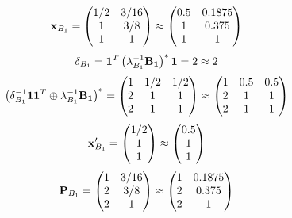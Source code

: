 \documentclass[10pt,a4paper]{article}
\begin{document}
	\[
		\bold{x}_{B_1} = 
		\begin{pmatrix}
			{1} / {{2}} & {{3}} / {{16}} \\
			{1}{} & {{3}} / {{8}} \\
			{1}{} & {1}{} \\
		\end{pmatrix}
		\approx
		\begin{pmatrix}
			0.5      & 0.1875   \\
			1        & 0.375    \\
			1        & 1        \\
		\end{pmatrix}
	\]
	\[
		\delta_{B_1} = \bold{1}^T \left(\lambda_{B_1}^{-1}\bold{B_1}\right)^* \bold{1} = {{2}}{}\approx 2
	\]
	\[
		\left(\delta_{B_1}^{-1}\bold{11}^T \oplus \lambda_{B_1}^{-1}\bold{B_1}\right)^* = 
		\begin{pmatrix}
			{1}{} & {1} / {{2}} & {1} / {{2}} \\
			{{2}}{} & {1}{} & {1}{} \\
			{{2}}{} & {1}{} & {1}{} \\
		\end{pmatrix}
		\approx
		\begin{pmatrix}
			1        & 0.5      & 0.5      \\
			2        & 1        & 1        \\
			2        & 1        & 1        \\
		\end{pmatrix}
	\]
	\[
		\bold{x}'_{B_1} = 
		\begin{pmatrix}
			{1} / {{2}} \\
			{1}{} \\
			{1}{} \\
		\end{pmatrix}
		\approx
		\begin{pmatrix}
			0.5      \\
			1        \\
			1        \\
		\end{pmatrix}
	\]
	\[
		\bold{P}_{B_1} = 
		\begin{pmatrix}
			{1}{} & {{3}} / {{16}} \\
			{{2}}{} & {{3}} / {{8}} \\
			{{2}}{} & {1}{} \\
		\end{pmatrix}
		\approx
		\begin{pmatrix}
			1        & 0.1875   \\
			2        & 0.375    \\
			2        & 1        \\
		\end{pmatrix}
	\]
\end{document}
